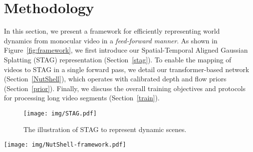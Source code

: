\section{Methodology}
In this section, we present a framework for efficiently representing world dynamics from monocular video in a \textit{feed-forward manner}. As shown in Figure~\ref{fig:framework}, we first introduce our Spatial-Temporal Aligned Gaussian Splatting (STAG) representation (Section~\ref{stag}). To enable the mapping of videos to STAG in a single forward pass, we detail our transformer-based network (Section~\ref{NutShell}), which operates with calibrated depth and flow priors (Section~\ref{prior}). Finally, we discuss the overall training objectives and protocols for processing long video segments (Section~\ref{train}).



\begin{figure}[t]
\centering
\vspace{-5mm}
\texttt{[image: img/STAG.pdf]}
\caption{The illustration of STAG to represent dynamic scenes.}
\label{fig:stag}
\end{figure}


\begin{figure*}[t]
\centering 
\texttt{[image: img/NutShell-framework.pdf]} 
\vspace{-10pt}
\caption{\textbf{Overview of NutWorld.} We directly predict STAG in a canonical space from sparse input frames via a transformer-based reconstruction model, where calibrated depth and flow priors are leveraged to avoid depth ambiguity and motion uncertainty.}
\label{fig:framework}
\vspace{-1mm}
\end{figure*}

